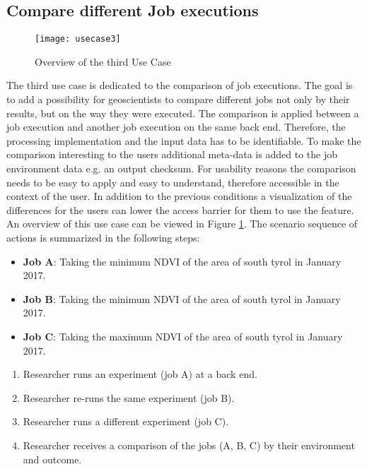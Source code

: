 \documentclass[draft,final]{vutinfth} %
\begin{document}
\subsection{Compare different Job executions}\label{UseCase3}
\begin{figure}[h]
	\centering
	\texttt{[image: usecase3]}
	\caption{Overview of the third Use Case}
	\label{fig:usecase3} %
\end{figure}
The third use case is dedicated to the comparison of job executions. The goal is to add a possibility for geoscientists to compare different jobs not only by their results, but on the way they were executed. The comparison is applied between a job execution and another job execution on the same back end. Therefore, the processing implementation and the input data has to be identifiable. To make the comparison interesting to the users additional meta-data is added to the job environment data e.g. an output checksum. For usability reasons the comparison needs to be easy to apply and easy to understand, therefore accessible in the context of the user. In addition to the previous conditions a visualization of the differences for the users can lower the access barrier for them to use the feature. An overview of this use case can be viewed in Figure \ref{fig:usecase3}.
The scenario sequence of actions is summarized in the following steps: \\

\begin{itemize}
	\item \textbf{Job A}: Taking the minimum NDVI of the area of south tyrol in January 2017. 
	\item \textbf{Job B}: Taking the minimum NDVI of the area of south tyrol in January 2017.
	\item \textbf{Job C}: Taking the maximum NDVI of the area of south tyrol in January 2017.
\end{itemize}

\begin{enumerate}
	\item Researcher runs an experiment (job A) at a back end.
	\item Researcher re-runs the same experiment (job B).
	\item Researcher runs a different experiment (job C).   
	\item Researcher receives a comparison of the jobs (A, B, C) by their environment and outcome.
\end{enumerate}
\end{document}
